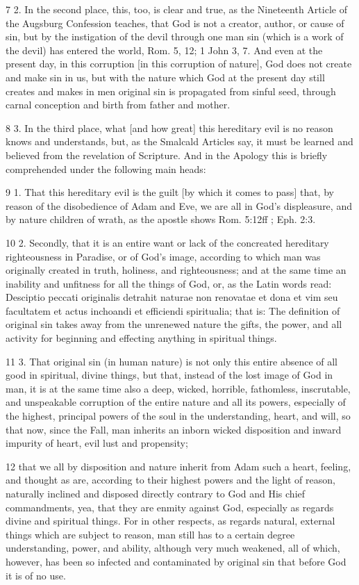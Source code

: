 7 2. In the second place, this, too, is clear and true, as the Nineteenth Article of the Augsburg Confession teaches, that God is not a creator, author, or cause of sin, but by the instigation of the devil through one man sin (which is a work of the devil) has entered the world, Rom. 5, 12; 1 John 3, 7. And even at the present day, in this corruption [in this corruption of nature], God does not create and make sin in us, but with the nature which God at the present day still creates and makes in men original sin is propagated from sinful seed, through carnal conception and birth from father and mother.

8 3. In the third place, what [and how great] this hereditary evil is no reason knows and understands, but, as the Smalcald Articles say, it must be learned and believed from the revelation of Scripture. And in the Apology this is briefly comprehended under the following main heads:

9 1. That this hereditary evil is the guilt [by which it comes to pass] that, by reason of the disobedience of Adam and Eve, we are all in God’s displeasure, and by nature children of wrath, as the apostle shows Rom. 5:12ff ; Eph. 2:3.

10 2. Secondly, that it is an entire want or lack of the concreated hereditary righteousness in Paradise, or of God’s image, according to which man was originally created in truth, holiness, and righteousness; and at the same time an inability and unfitness for all the things of God, or, as the Latin words read: Desciptio peccati originalis detrahit naturae non renovatae et dona et vim seu facultatem et actus inchoandi et efficiendi spiritualia; that is: The definition of original sin takes away from the unrenewed nature the gifts, the power, and all activity for beginning and effecting anything in spiritual things.

11 3. That original sin (in human nature) is not only this entire absence of all good in spiritual, divine things, but that, instead of the lost image of God in man, it is at the same time also a deep, wicked, horrible, fathomless, inscrutable, and unspeakable corruption of the entire nature and all its powers, especially of the highest, principal powers of the soul in the understanding, heart, and will, so that now, since the Fall, man inherits an inborn wicked disposition and inward impurity of heart, evil lust and propensity;

12 that we all by disposition and nature inherit from Adam such a heart, feeling, and thought as are, according to their highest powers and the light of reason, naturally inclined and disposed directly contrary to God and His chief commandments, yea, that they are enmity against God, especially as regards divine and spiritual things. For in other respects, as regards natural, external things which are subject to reason, man still has to a certain degree understanding, power, and ability, although very much weakened, all of which, however, has been so infected and contaminated by original sin that before God it is of no use.

